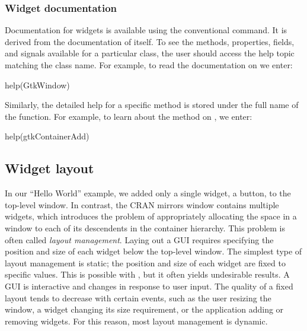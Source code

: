\documentclass[article,shortnames]{jss}
\begin{document}
\subsubsection{Widget documentation}

Documentation for widgets is available using the conventional
 command. It is derived from the documentation of
 itself.
To see the methods, properties, fields, and signals available
for a particular class, the user should access the help topic matching
the class name.
For example, to read the documentation on  we enter:
\begin{Code}
help(GtkWindow)
\end{Code}

Similarly, the detailed help for a specific method is stored under the
full name of the function. For example, to learn about the 
method on , we enter:
\begin{Code}
help(gtkContainerAdd)
\end{Code}

\subsection{Widget layout}\label{sec:layout}


In our ``Hello World'' example, we added only a single widget, a
button, to the  top-level window. In contrast, the CRAN mirrors window
contains multiple widgets, which introduces the problem of
appropriately allocating the space in a window to each of its
descendents in the container hierarchy. This problem is often called
\emph{layout management}. Laying out a GUI requires specifying the
position and size of each widget below the top-level window. The
simplest type of layout management is static; the position and size of
each widget are fixed to specific values. This is possible
with , but it often yields undesirable results. A GUI is
interactive and changes in response to user input. The quality of a
fixed layout tends to decrease with certain events, such as the user
resizing the window, a widget changing its size requirement, or the
application adding or removing widgets. For this reason, most layout
management is dynamic.
\end{document}
